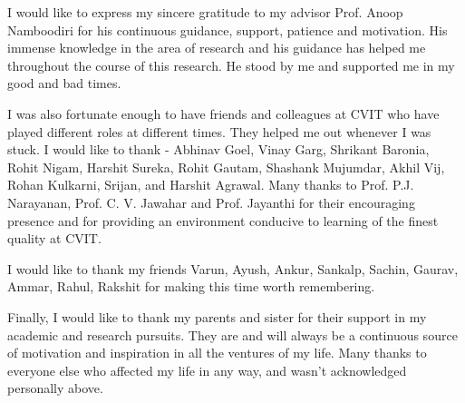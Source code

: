 I would like to express my sincere gratitude to my advisor Prof. Anoop Namboodiri
for his continuous guidance, support, patience and motivation. His immense knowledge in the area of
research and his guidance has helped me throughout the course of this research. He stood by me and supported me in my good and bad times.

I was also fortunate enough to have friends and colleagues at CVIT who have played
different roles at different times. They helped me out whenever I was stuck. I would like to thank - Abhinav Goel, Vinay Garg,
Shrikant Baronia, Rohit Nigam, Harshit Sureka, Rohit Gautam, Shashank Mujumdar, Akhil Vij, Rohan Kulkarni, Srijan, and Harshit Agrawal. 
Many thanks to Prof. P.J. Narayanan, Prof. C. V. Jawahar and Prof. Jayanthi 
 for their encouraging presence and for providing an environment conducive to learning of
the finest quality at CVIT.

I would like to thank my friends Varun, Ayush, Ankur, Sankalp, Sachin, Gaurav, Ammar, Rahul, Rakshit for making this time worth remembering.

Finally, I would like to thank my parents and sister for their support in my academic and research pursuits.
They are and will always be a continuous source of motivation and inspiration in all the
ventures of my life. 
Many thanks to everyone else who affected my life in any way, and wasn't acknowledged personally
above.